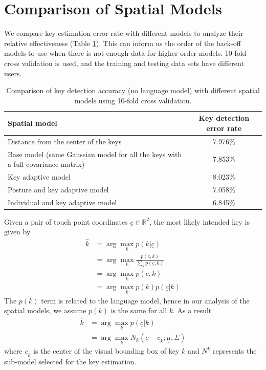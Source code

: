 \documentclass{sigchi}
\newcommand\tabhead[1]{\small\textbf{#1}}
\begin{document}
\section{Comparison of Spatial Models}
We compare key estimation error rate with different models to analyze their
relative effectiveness (Table \ref{tab:comparison}). This can inform us the order of the
back-off models to use when there is not enough data for higher order models.
10-fold cross validation is used, and the training and testing data sets have
different users.

\begin{table} [tb]
  \centering
  \begin{tabular}{|l|c|}
    \hline
    \tabhead{Spatial model} &
    \multicolumn{1}{|p{0.2\columnwidth}|}{\centering\tabhead{Key detection
    error rate}} \\
    \hline
    Distance from the center of the keys & 7.976\% \\
    \hline
    \multicolumn{1}{|p{0.7\columnwidth}|}{Base model (same Gaussian model for
    all the keys with a full covariance matrix)} & 7.853\% \\
    \hline
    Key adaptive model  & 8.023\% \\
    \hline
    Posture and key adaptive model & 7.058\% \\
    \hline
    Individual and key adaptive model  & 6.845\% \\
    \hline
  \end{tabular}
  \caption{Comparison of key detection accuracy (no language model) with
  different spatial models using 10-fold cross validation.}
  \label{tab:comparison}
\end{table}

Given a pair of touch point coordinates $\underline c \in \mathbb{R}^2$, the most likely intended key is given by 
\begin{align}
\hat k &= \arg\max_k p(k | \underline c) \\
          &= \arg\max_k \frac{p(\underline c, k)}{\sum_k p(\underline c, k)} \\
          &= \arg\max_k p(\underline c, k) \\
          &= \arg\max_k p(k)p(\underline c | k)
\end{align}
The $p(k)$ term is related to the language model, hence in our analysis of the spatial models, we assume $p(k)$ is the same for all $k$. As a result
\begin{align}
\hat k &= \arg\max_k p(\underline c | k)  \\
          &= \arg\max_k N_k(\underline c - \underline c_k; \underline\mu, \Sigma)
\end{align}
where $\underline c_k$ is the center of the visual bounding box of key $k$ and $N^k$ represents the sub-model selected for the key estimation.
\end{document}
